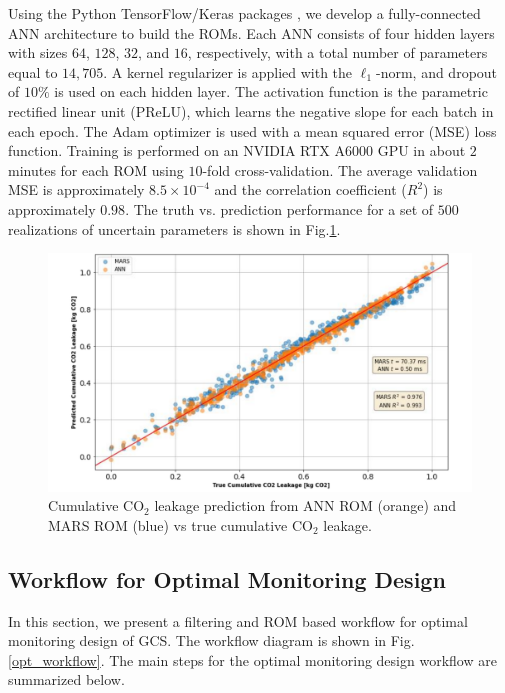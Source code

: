 \documentclass[a4paper,fleqn]{cas-sc}
\begin{document}
Using the Python TensorFlow/Keras packages \citep{tensorflow2015-whitepaper, chollet2015keras}, we develop a fully-connected ANN architecture to build the ROMs. Each ANN consists of four hidden layers with sizes $64$, $128$, $32$, and $16$, respectively, with a total number of parameters equal to $14,705$. A kernel regularizer is applied with the $\ell_1$-norm, and dropout of $10\%$ is used on each hidden layer. The activation function is the parametric rectified linear unit (PReLU), which learns the negative slope for each batch in each epoch. The Adam optimizer \citep{Kingma2014Adam} is used with a mean squared error (MSE) loss function. Training is performed on an NVIDIA RTX A$6000$ GPU in about $2$ minutes for each ROM using $10$-fold cross-validation. The average validation MSE is approximately $8.5\times10^{-4}$ and the correlation coefficient ($R^2$) is approximately $0.98$. The truth vs. prediction performance for a set of $500$ realizations of uncertain parameters is shown in Fig.\ref{rom_train}.

\begin{figure}
    \centering
    \includegraphics[width=0.7\linewidth]{figs/Figure 3.pdf}
    \caption{Cumulative CO$_2$ leakage prediction from ANN ROM (orange) and MARS ROM (blue) vs true cumulative CO$_2$ leakage.}
    \label{rom_train}
\end{figure}

\subsection{Workflow for Optimal Monitoring Design}
In this section, we present a filtering and ROM based workflow for optimal monitoring design of GCS. The workflow diagram is shown in Fig. \ref{opt_workflow}. The main steps for the optimal monitoring design workflow are summarized below.
\end{document}
